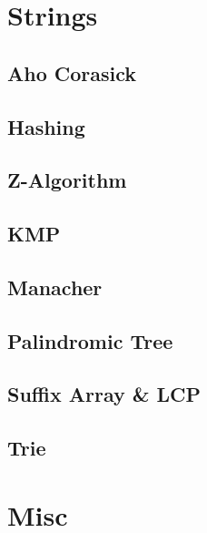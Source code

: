 	\section{Strings}
		\subsection{Aho Corasick}
			
		\subsection{Hashing}
			
		\subsection{Z-Algorithm}
			
		\subsection{KMP}
			
		\subsection{Manacher}
			
		\subsection{Palindromic Tree}
			
		\subsection{Suffix Array & LCP}
			
		\subsection{Trie}
			
	\section{Misc}
